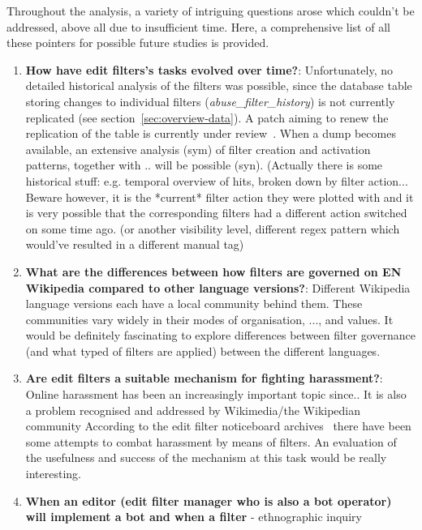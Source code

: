 Throughout the analysis, a variety of intriguing questions arose which couldn't be addressed, above all due to insufficient time.
Here, a comprehensive list of all these pointers for possible future studies is provided.

\begin{enumerate}
    \item \textbf{How have edit filters's tasks evolved over time?}: Unfortunately, no detailed historical analysis of the filters was possible, since the database table storing changes to individual filters (\emph{abuse\_filter\_history}) is not currently replicated (see section~\ref{sec:overview-data}). A patch aiming to renew the replication of the table is currently under review~\cite{gerrit-tables-replication}. When a dump becomes available, an extensive analysis (sym) of filter creation and activation patterns, together with .. will be possible (syn).
        (Actually there is some historical stuff: e.g. temporal overview of hits, broken down by filter action... Beware however, it is the *current* filter action they were plotted with and it is very possible that the corresponding filters had a different action switched on some time ago. %
        (or another visibility level, different regex pattern which would've resulted in a different manual tag)
    \item \textbf{What are the differences between how filters are governed on EN Wikipedia compared to other language versions?}: Different Wikipedia language versions each have a local community behind them. %
        These communities vary widely in their modes of organisation, ..., and values. It would be definitely fascinating to explore differences between filter governance (and what typed of filters are applied) between the different languages.
    \item \textbf{Are edit filters a suitable mechanism for fighting harassment?}: Online harassment has been an increasingly important topic since.. %
        It is also a problem recognised and addressed by Wikimedia/the Wikipedian community %
        According to the edit filter noticeboard archives~\cite{Wikipedia:EditFilterNoticeboardHarassment} there have been some attempts to combat harassment by means of filters.
        An evaluation of the usefulness and success of the mechanism at this task would be really interesting.
    \item \textbf{When an editor (edit filter manager who is also a bot operator) will implement a bot and when a filter} - ethnographic inquiry

\end{enumerate}
